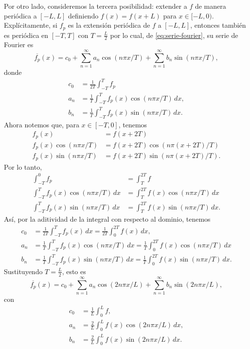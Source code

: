 \documentclass[11pt,letterpaper,draft]{report}
\theoremstyle{plain}
\theoremstyle{definition}
\theoremstyle{remark}
\newcommand\<{\langle}
\renewcommand\>{\rangle}
\begin{document}
Por otro lado, consideremos la tercera posibilidad: extender a $f$ de
manera periódica a $[-L,L]$ definiendo $f(x)=f(x+L)$ para
$x\in[-L,0)$.
Explícitamente, si $f_p$ es la extensión periódica de $f$ a $[-L,L]$,
entonces también es periódica en $[-T,T]$ con $T=\frac{L}{2}$
por lo cual, de \eqref{eq:serie-fourier}, su serie de Fourier es
\[
  \overline{f_p}(x) = c_0
  + \sum_{n=1}^\infty a_n\cos(n\pi x/T)
  + \sum_{n=1}^\infty b_n\sin(n\pi x/T)
,
\]
donde
\begin{align*}
  c_0 &= \frac{1}{2T}\int_{-T}^T f_p \\
  a_n &= \frac{1}{T}\int_{-T}^T f_p(x)\cos(n\pi x/T)\,dx, \\
  b_n &= \frac{1}{T}\int_{-T}^T f_p(x)\sin(n\pi x/T)\,dx.
\end{align*}
Ahora notemos que, para $x\in[-T,0]$, tenemos
\begin{align*}
  f_p(x) &=f(x+2T) \\
  f_p(x)\cos(n\pi x/T) &=f(x+2T)\cos(n\pi(x+2T)/T) \\
  f_p(x)\sin(n\pi x/T) &=f(x+2T)\sin(n\pi(x+2T)/T).
\end{align*}
Por lo tanto,
\begin{align*}
  \int_{-T}^{0}f_p
    &=\int_{T}^{2T}f \\
  \int_{-T}^{T}f_p(x)\cos(n\pi x/T)\,dx
    &=\int_{T}^{2T}f(x)\cos(n\pi x/T)\,dx \\
  \int_{-T}^{T}f_p(x)\sin(n\pi x/T)\,dx
    &=\int_{T}^{2T}f(x)\sin(n\pi x/T)\,dx.
\end{align*}
Así, por la aditividad de la integral con respecto al dominio, tenemos
\begin{align*}
  c_0
  &= \frac{1}{2T}\int_{-T}^T f_p(x)\,dx
  = \frac{1}{2T}\int_{0}^{2T} f(x)\,dx, \\
  a_n
  &= \frac{1}{T}\int_{-T}^T f_p(x)\cos(n\pi x/T)\,dx
  = \frac{1}{T}\int_{0}^{2T} f(x)\cos(n\pi x/T)\,dx \\
  b_n
  &= \frac{1}{T}\int_{-T}^T f_p(x)\sin(n\pi x/T)\,dx
  = \frac{1}{T}\int_{0}^{2T} f(x)\sin(n\pi x/T)\,dx.
\end{align*}
Sustituyendo $T=\frac{L}{2}$, esto es
\begin{equation}
  \overline{f_p}(x) = c_0
  + \sum_{n=1}^\infty a_n\cos(2n\pi x/L)
  + \sum_{n=1}^\infty b_n\sin(2n\pi x/L)
,
\end{equation}
con
\begin{align*}
  c_0
  &= \frac{1}{L}\int_{0}^{L} f, \\
  a_n
  &= \frac{2}{L}\int_{0}^{L} f(x)\cos(2n\pi x/L)\,dx, \\
  b_n
  &= \frac{2}{L}\int_{0}^{L} f(x)\sin(2n\pi x/L)\,dx.
\end{align*}
\end{document}
